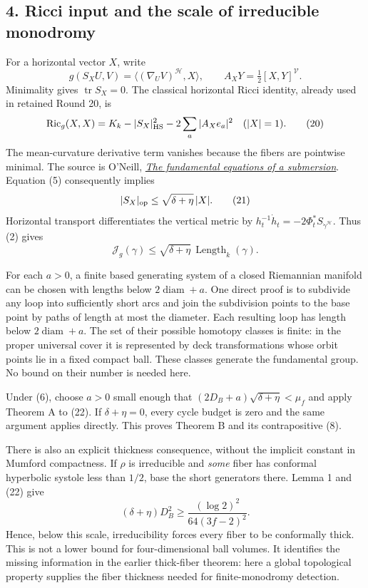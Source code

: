 \documentclass[
  11pt,
]{article}
\begin{document}
\hypertarget{ricci-input-and-the-scale-of-irreducible-monodromy}{%
\subsection{4. Ricci input and the scale of irreducible
monodromy}\label{ricci-input-and-the-scale-of-irreducible-monodromy}}

For a horizontal vector \(X\), write \[
 g(S_XU,V)=\langle(\nabla_UV)^{\mathcal H},X\rangle,
 \qquad A_XY=\tfrac12[X,Y]^{\mathcal V}.
\] Minimality gives \(\operatorname{tr}S_X=0\). The classical horizontal
Ricci identity, already used in retained Round 20, is \[
 \operatorname{Ric}_g(X,X)
      =K_k-|S_X|_{\rm HS}^2-2\sum_a|A_Xe_a|^2
                      \quad(|X|=1).                         \tag{20}
\] The mean-curvature derivative term vanishes because the fibers are
pointwise minimal. The source is O'Neill,
\href{https://doi.org/10.1307/mmj/1028999604}{\emph{The fundamental
equations of a submersion}}. Equation (5) consequently implies \[
                         |S_X|_{\rm op}
                               \le\sqrt{\delta+\eta}\,|X|.  \tag{21}
\] Horizontal transport differentiates the vertical metric by
\(h_t^{-1}\dot h_t=-2\Phi_t^*S_{\dot\gamma^{\mathcal H}}\). Thus (2)
gives \[
                    \mathcal J_g(\gamma)
                          \le\sqrt{\delta+\eta}\,
                                      \operatorname{Length}_k(\gamma).
\tag{22}
\]

For each \(a>0\), a finite based generating system of a closed
Riemannian manifold can be chosen with lengths below
\(2\operatorname{diam}+a\). One direct proof is to subdivide any loop
into sufficiently short arcs and join the subdivision points to the base
point by paths of length at most the diameter. Each resulting loop has
length below \(2\operatorname{diam}+a\). The set of their possible
homotopy classes is finite: in the proper universal cover it is
represented by deck transformations whose orbit points lie in a fixed
compact ball. These classes generate the fundamental group. No bound on
their number is needed here.

Under (6), choose \(a>0\) small enough that
\((2D_B+a)\sqrt{\delta+\eta}<\mu_f\) and apply Theorem A to (22). If
\(\delta+\eta=0\), every cycle budget is zero and the same argument
applies directly. This proves Theorem B and its contrapositive (8).

There is also an explicit thickness consequence, without the implicit
constant in Mumford compactness. If \(\rho\) is irreducible and
\emph{some} fiber has conformal hyperbolic systole less than \(1/2\),
base the short generators there. Lemma 1 and (22) give \[
 (\delta+\eta)D_B^2
                  \ge\frac{(\log2)^2}{64(3f-2)^2}.            \tag{23}
\] Hence, below this scale, irreducibility forces every fiber to be
conformally thick. This is not a lower bound for four-dimensional ball
volumes. It identifies the missing information in the earlier
thick-fiber theorem: here a global topological property supplies the
fiber thickness needed for finite-monodromy detection.
\end{document}
